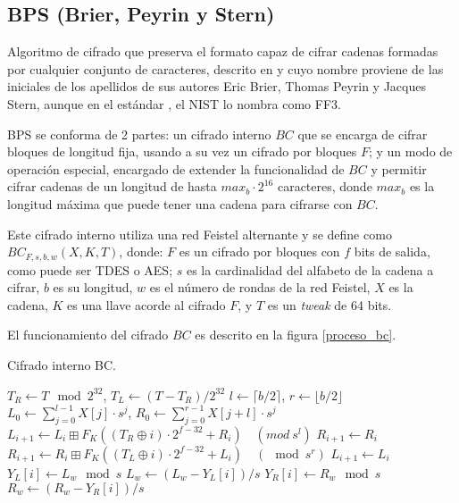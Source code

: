 %
%

\subsection{BPS (Brier, Peyrin y Stern)}


Algoritmo de cifrado que preserva el formato capaz de cifrar cadenas formadas
por cualquier conjunto de caracteres, descrito en \cite{bps} y cuyo nombre
proviene de las iniciales de los apellidos de sus autores Eric Brier, Thomas
Peyrin y Jacques Stern, aunque en el estándar \cite{nist_fpe}, el NIST lo
nombra como FF3.


BPS se conforma de 2 partes: un cifrado interno $BC$ que se encarga de cifrar
bloques de longitud fija, usando a su vez un cifrado por bloques $F$; y un modo
de operación especial, encargado de extender la funcionalidad de $BC$ y permitir
cifrar cadenas de un longitud de hasta $max_b \cdot 2^{16}$ caracteres, donde
$max_b$ es la longitud máxima que puede tener una cadena para cifrarse con $BC$.

Este cifrado interno utiliza una red Feistel alternante y se define como
$BC_{F,s,b,w}(X,K,T)$, donde: $F$ es un cifrado por bloques con $f$ bits de
salida, como puede ser TDES o AES; $s$ es la cardinalidad del alfabeto de la
cadena a cifrar, $b$ es su longitud, $w$ es el número de rondas de la red
Feistel, $X$ es la cadena, $K$ es una llave acorde al cifrado $F$, y $T$ es
un \textit{tweak} de 64 bits.

El funcionamiento del cifrado $BC$ es descrito en la figura \ref{proceso_bc}.

\begin{algorithm}
  \caption{\label{proceso_bc} Cifrado interno BC.}
  \begin{algorithmic}[1]
      \State $ T_R \gets T \mod 2^{32} $,
        $ T_L \gets (T - T_R) / 2^{32} $
      \State $ l \gets \lceil b/2 \rceil $,
        $ r \gets \lfloor b/2 \rfloor $
      \State $ L_0 \gets \sum_{j=0}^{l-1} X[j] \cdot s^j $,
        $ R_0 \gets \sum_{j=0}^{r-1} X[j+l] \cdot s^j $
          \State $ L_{i+1} \gets L_i \boxplus F_K((T_R \oplus i)
            \cdot 2^{f-32} + R_i)\quad (mod\ s^l) $
          \State $ R_{i+1} \gets R_i $
        \Else
          \State $ R_{i+1} \gets R_i \boxplus F_K((T_L \oplus i)
            \cdot 2^{f-32} + L_i)\quad (\mod s^r) $
          \State $ L_{i+1} \gets L_i $
        \EndIf
      \EndFor
        \State $ Y_L[i] \gets L_w \mod s $
        \State $ L_w \gets (L_w - Y_L[i])/s $
      \EndFor
        \State $ Y_R[i] \gets R_w \mod s $
        \State $ R_w \gets (R_w - Y_R[i])/s $
      \EndFor
      \State {}
    \EndFunction
  \end{algorithmic}
\end{algorithm}

